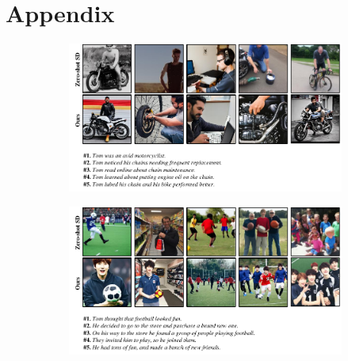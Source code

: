\documentclass{article} %
\begin{document}




\newpage
\appendix
\section{Appendix}
\begin{figure}[!htbp]
\begin{center}
    \begin{subfigure}
        \centering
        \includegraphics[width=0.76\linewidth]{figure/3-example.pdf}
        \caption*{}
    \end{subfigure}
    
    \begin{subfigure}
        \centering
        \includegraphics[width=0.76\linewidth]{figure/4-example.pdf}
        \caption*{}
    \end{subfigure}
    

\end{center}
\end{figure}
\end{document}
